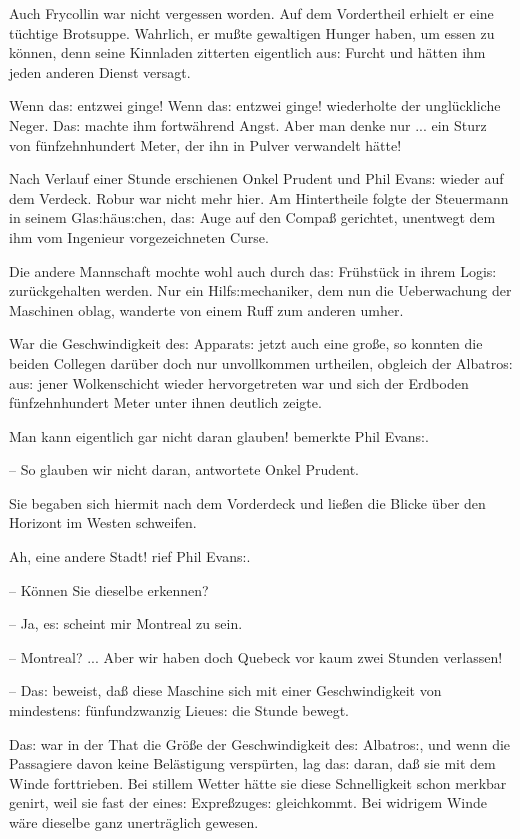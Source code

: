 \documentclass[oneside,12pt]{book}
\newcommand{\s}{s:}
\begin{document}
Auch Frycollin war nicht vergessen worden. Auf dem Vordertheil
erhielt er eine t\"uchtige Brotsuppe. Wahrlich, er mu{\ss}te
gewaltigen Hunger haben, um essen zu k\"onnen, denn seine Kinnladen
zitterten eigentlich au{\s} Furcht und h\"atten ihm jeden anderen
Dienst versagt.

{\glqq}Wenn da{\s} ent\/zwei ginge! Wenn da{\s} ent\/zwei ginge!{\grqq}
wiederholte der ungl\"uckliche Neger. Da{\s} machte ihm fortw\"ahrend
Angst. Aber man denke nur ... ein Sturz von f\"unfzehnhundert Meter,
der ihn in Pulver verwandelt h\"atte!

Nach Verlauf einer Stunde erschienen Onkel Prudent und Phil Evan{\s}
wieder auf dem Verdeck. Robur war nicht mehr hier. Am Hintertheile
folgte der Steuermann in seinem Gla{\s}h\"au{\s}chen, da{\s} Auge auf
den Compa{\ss} gerichtet, unentwegt dem ihm vom Ingenieur
vorgezeichneten Curse.

Die andere Mannschaft mochte wohl auch durch da{\s} Fr\"uhst\"uck in
ihrem Logi{\s} zur\"uckgehalten werden. Nur ein Hilf{\s}mechaniker,
dem nun die Ueberwachung der Maschinen oblag, wanderte von einem Ruff
zum anderen umher.

War die Geschwindigkeit de{\s} Apparat{\s} jetzt auch eine gro{\ss}e,
so konnten die beiden Collegen dar\"uber doch nur unvollkommen
urtheilen, obgleich der {\glqq}Albatro{\s}{\grqq} au{\s} jener
Wolkenschicht wieder hervorgetreten war und sich der Erdboden
f\"unfzehnhundert Meter unter ihnen deutlich zeigte.

{\glqq}Man kann eigentlich gar nicht daran glauben! bemerkte Phil
Evan{\s}.

-- So glauben wir nicht daran,{\grqq} antwortete Onkel Prudent.

Sie begaben sich hiermit nach dem Vorderdeck und lie{\ss}en die
Blicke \"uber den Horizont im Westen schweifen.

{\glqq}Ah, eine andere Stadt! rief Phil Evan{\s}.

-- K\"onnen Sie dieselbe erkennen?

-- Ja, e{\s} scheint mir Montreal zu sein.

-- Montreal? ... Aber wir haben doch Quebeck vor kaum zwei Stunden
verlassen!

-- Da{\s} beweist, da{\ss} diese Maschine sich mit einer
Geschwindigkeit von mindesten{\s} f\"unfundzwanzig Lieue{\s} die
Stunde bewegt.{\grqq}

Da{\s} war in der That die Gr\"o{\ss}e der Geschwindigkeit de{\s}
{\glqq}Albatro{\s}{\grqq}, und wenn die Passagiere davon keine
Bel\"astigung versp\"urten, lag da{\s} daran, da{\ss} sie mit dem
Winde forttrieben. Bei stillem Wetter h\"atte sie diese Schnelligkeit
schon merkbar genirt, weil sie fast der eine{\s} Expre{\ss}zuge{\s}
gleichkommt. Bei widrigem Winde w\"are dieselbe ganz unertr\"aglich
gewesen.
\end{document}
